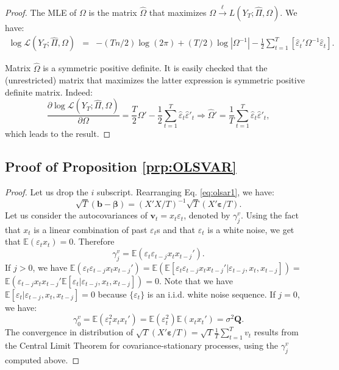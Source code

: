 \documentclass[
]{book}
\theoremstyle{definition}
\theoremstyle{definition}
\theoremstyle{definition}
\theoremstyle{definition}
\theoremstyle{remark}
\begin{document}
\begin{proof}
The MLE of \(\Omega\) is the matrix \(\hat{\Omega}\) that maximizes \(\Omega\overset{\ell}{\rightarrow}L(Y_{T};\hat{\Pi},\Omega)\). We have:
\begin{eqnarray*}
\log\mathcal{L}(Y_{T};\hat{\Pi},\Omega) & = & -(Tn/2)\log(2\pi)+(T/2)\log\left|\Omega^{-1}\right| -\frac{1}{2}\sum_{t=1}^{T}\left[\hat{\varepsilon}_{t}'\Omega^{-1}\hat{\varepsilon}_{t}\right].
\end{eqnarray*}

Matrix \(\hat{\Omega}\) is a symmetric positive definite. It is easily checked that the (unrestricted) matrix that maximizes the latter expression is symmetric positive definite matrix. Indeed:
\[
\frac{\partial \log\mathcal{L}(Y_{T};\hat{\Pi},\Omega)}{\partial\Omega}=\frac{T}{2}\Omega'-\frac{1}{2}\sum_{t=1}^{T}\hat{\varepsilon}_{t}\hat{\varepsilon}'_{t}\Rightarrow\hat{\Omega}'=\frac{1}{T}\sum_{t=1}^{T}\hat{\varepsilon}_{t}\hat{\varepsilon}'_{t},
\]
which leads to the result.
\end{proof}

\hypertarget{OLSVAR}{%
\subsection{Proof of Proposition \ref{prp:OLSVAR}}\label{OLSVAR}}

\begin{proof}
Let us drop the \(i\) subscript. Rearranging Eq. \eqref{eq:olsar1}, we have:
\[
\sqrt{T}(\mathbf{b}-\boldsymbol{\beta}) =  (X'X/T)^{-1}\sqrt{T}(X'\boldsymbol\varepsilon/T).
\]
Let us consider the autocovariances of \(\mathbf{v}_t = x_t \varepsilon_t\), denoted by \(\gamma^v_j\). Using the fact that \(x_t\) is a linear combination of past \(\varepsilon_t\)s and that \(\varepsilon_t\) is a white noise, we get that \(\mathbb{E}(\varepsilon_t x_t)=0\). Therefore
\[
\gamma^v_j = \mathbb{E}(\varepsilon_t\varepsilon_{t-j}x_tx_{t-j}').
\]
If \(j>0\), we have \(\mathbb{E}(\varepsilon_t\varepsilon_{t-j}x_tx_{t-j}')=\mathbb{E}(\mathbb{E}[\varepsilon_t\varepsilon_{t-j}x_tx_{t-j}'|\varepsilon_{t-j},x_t,x_{t-j}])=\) \(\mathbb{E}(\varepsilon_{t-j}x_tx_{t-j}'\mathbb{E}[\varepsilon_t|\varepsilon_{t-j},x_t,x_{t-j}])=0\). Note that we have \(\mathbb{E}[\varepsilon_t|\varepsilon_{t-j},x_t,x_{t-j}]=0\) because \(\{\varepsilon_t\}\) is an i.i.d. white noise sequence. If \(j=0\), we have:
\[
\gamma^v_0 = \mathbb{E}(\varepsilon_t^2x_tx_{t}')= \mathbb{E}(\varepsilon_t^2) \mathbb{E}(x_tx_{t}')=\sigma^2\mathbf{Q}.
\]
The convergence in distribution of \(\sqrt{T}(X'\boldsymbol\varepsilon/T)=\sqrt{T}\frac{1}{T}\sum_{t=1}^Tv_t\) results from the Central Limit Theorem for covariance-stationary processes, using the \(\gamma_j^v\) computed above.
\end{proof}
\end{document}
